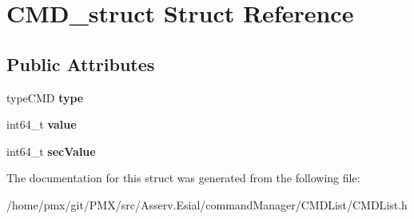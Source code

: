 \hypertarget{structCMD__struct}{}\section{C\+M\+D\+\_\+struct Struct Reference}
\label{structCMD__struct}
\subsection*{Public Attributes}
\begin{DoxyCompactItemize}
\item 
\mbox{\label{structCMD__struct_a1df35a34527eeb7becada9c955eec30f}} 
type\+C\+MD {\bfseries type}
\item 
\mbox{\label{structCMD__struct_a840437c5a7d21348fb6e0a75844c220b}} 
int64\+\_\+t {\bfseries value}
\item 
\mbox{\label{structCMD__struct_adf4cf6334c1b6060c326f313d59584d7}} 
int64\+\_\+t {\bfseries sec\+Value}
\end{DoxyCompactItemize}


The documentation for this struct was generated from the following file\+:\begin{DoxyCompactItemize}
\item 
/home/pmx/git/\+P\+M\+X/src/\+Asserv.\+Esial/command\+Manager/\+C\+M\+D\+List/C\+M\+D\+List.\+h\end{DoxyCompactItemize}
